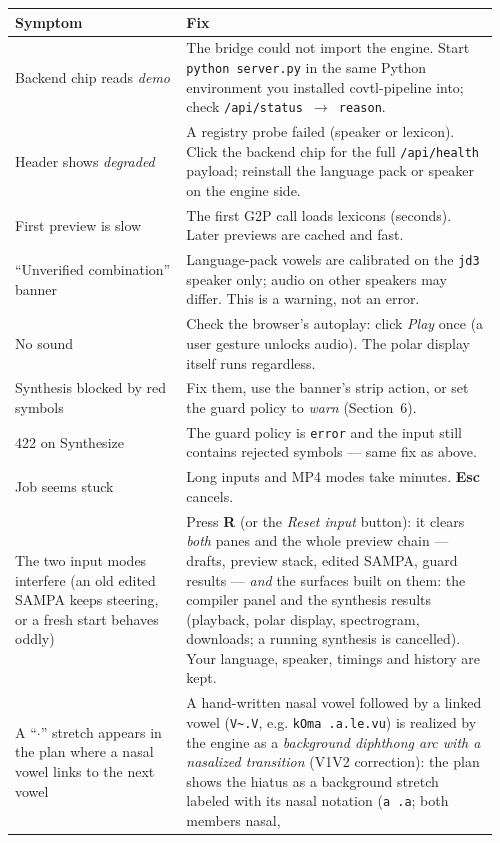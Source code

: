 \documentclass[11pt,a4paper]{article}
\newcommand{\key}[1]{\textbf{#1}}
\begin{document}
\begin{longtable}{p{0.34\linewidth}p{0.62\linewidth}}
\textbf{Symptom} & \textbf{Fix} \\
\hline
Backend chip reads \emph{demo} & The bridge could not import the engine.
Start \texttt{python server.py} in the same Python environment you
installed covtl-pipeline into; check \texttt{/api/status $\rightarrow$
reason}. \\
Header shows \emph{degraded} & A registry probe failed (speaker or
lexicon). Click the backend chip for the full \texttt{/api/health}
payload; reinstall the language pack or speaker on the engine side. \\
First preview is slow & The first G2P call loads lexicons (seconds). Later
previews are cached and fast. \\
``Unverified combination'' banner & Language-pack vowels are calibrated
on the \texttt{jd3} speaker only; audio on other speakers may differ.
This is a warning, not an error. \\
No sound & Check the browser's autoplay: click \emph{Play} once (a user
gesture unlocks audio). The polar display itself runs regardless. \\
Synthesis blocked by red symbols & Fix them, use the banner's strip
action, or set the guard policy to \emph{warn} (Section~6). \\
422 on Synthesize & The guard policy is \texttt{error} and the input
still contains rejected symbols --- same fix as above. \\
Job seems stuck & Long inputs and MP4 modes take minutes. \key{Esc}
cancels. \\
The two input modes interfere (an old edited SAMPA keeps steering, or a
fresh start behaves oddly) & Press \key{R} (or the \emph{Reset input}
button): it clears \emph{both} panes and the whole preview chain ---
drafts, preview stack, edited SAMPA, guard results --- \emph{and} the
surfaces built on them: the compiler panel and the synthesis results
(playback, polar display, spectrogram, downloads; a running synthesis
is cancelled). Your language, speaker, timings and history are kept. \\
A ``$\cdot$'' stretch appears in the plan where a nasal vowel links to
the next vowel & A hand-written nasal vowel followed by a linked vowel
(\texttt{V\~{}.V}, e.g. \texttt{kOma~.a.le.vu}) is realized by the
engine as a \emph{background diphthong arc with a nasalized transition}
(V1V2 correction): the plan shows the hiatus as a background stretch
labeled with its nasal notation (\texttt{a~.a}; both members nasal,

\end{longtable}
\end{document}
